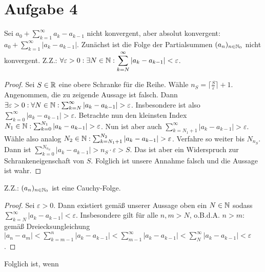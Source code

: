 \documentclass{article}
\renewcommand{\epsilon}{\varepsilon}
\begin{document}
	\section*{Aufgabe 4}
	Sei $\displaystyle a_0 + \sum_{k=1}^{\infty} a_k - a_{k-1}$ nicht konvergent, aber absolut konvergent: $\displaystyle a_0 + \sum_{k=1}^{\infty} |a_k - a_{k-1}|$.
	Zunächst ist die Folge der Partialsummen $(a_n)_{n\in \mathbb{N}_0}$ nicht konvergent.
	Z.Z.: $\displaystyle  \forall \epsilon > 0: \exists N\in \N:\sum_{k=N}^{\infty} |a_k -a_{k-1}| < \epsilon$.
	\begin{proof}
		Sei $S\in \mathbb{R}$ eine obere Schranke für die Reihe. Wähle $n_S = \lceil\frac{S}{\epsilon}\rceil + 1$.
		Angenommen, die zu zeigende Aussage ist falsch. Dann $\exists \epsilon > 0: \forall N\in \N: \sum_{k=N}^{\infty} |a_k -a_{k-1}| > \epsilon$. Insbesondere ist also $\sum_{k=0}^{\infty} |a_k -a_{k-1}| > \epsilon$. Betrachte nun den kleinsten Index $N_1\in \N: \sum_{k=0}^{N_1} |a_k -a_{k-1}| > \epsilon$. Nun ist aber auch $\sum_{k=N_1+1}^{\infty} |a_k -a_{k-1}| > \epsilon$. Wähle also analog $N_2\in \N: \sum_{k=N_1 + 1}^{N_2} |a_k -a_{k-1}| > \epsilon$.
		Verfahre so weiter bis $N_{n_S}$. Dann ist $\sum_{k=0}^{N_{n_S}} |a_k -a_{k-1}| > n_S \cdot \epsilon > S$. Das ist aber ein Widerspruch zur Schrankeneigenschaft von $S$. Folglich ist unsere Annahme falsch und die Aussage ist wahr. 
	\end{proof}
	Z.Z.: $(a_n)_{n\in \mathbb{N}_0}$ ist eine Cauchy-Folge.
	\begin{proof}
		Sei $\epsilon > 0$. Dann existiert gemäß unserer Aussage oben ein $N\in \mathbb{N}$ sodass $\displaystyle \sum_{k=N}^{\infty} |a_k -a_{k-1}| < \epsilon$. 
		Insbesondere gilt für alle $n, m > N$, o.B.d.A. $n > m:$ gemäß Dreiecksungleichung $|a_n-a_m| < \sum_{k = m-1}^n|a_k - a_{k-1}| < \sum_{m-1}^{\infty} |a_k - a_{k-1}| < \sum_{N}^{\infty} |a_k - a_{k-1}| < \epsilon$.
	\end{proof}
	Folglich ist, wenn 
\end{document}
